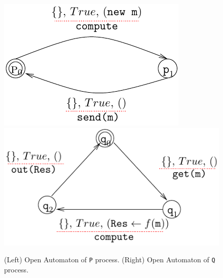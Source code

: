 \documentclass[runningheads]{llncs}
\begin{document}
\begin{figure}[h]
 \centering
   \includegraphics[width=.40\textwidth]{Figures/P-proc.pdf}\hfill 
   \includegraphics[width=.55\textwidth]{Figures/Q-proc.pdf}
   \caption{(Left) Open Automaton of \texttt{P} process.   (Right) Open Automaton of  \texttt{Q} process.\label{Fig:processes}}
\end{figure}
\end{document}
